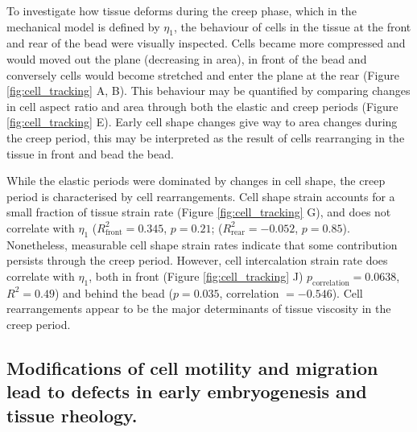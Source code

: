 To investigate how tissue deforms during the creep phase, which in the mechanical model is defined by $\eta_1$, the behaviour of cells in the tissue at the front and rear of the bead were visually inspected.
Cells became more compressed and would moved out the plane (decreasing in area), in front of the bead and conversely cells would become stretched and enter the plane at the rear (Figure \ref{fig:cell_tracking} A, B).
This behaviour may be quantified by comparing changes in cell aspect ratio and area through both the elastic and creep periods (Figure \ref{fig:cell_tracking} E).
Early cell shape changes give way to area changes during the creep period, this may be interpreted as the result of cells rearranging in the tissue in front and bead the bead.

While the elastic periods were dominated by changes in cell shape, the creep period is characterised by cell rearrangements.
Cell shape strain accounts for a small fraction of tissue strain rate (Figure \ref{fig:cell_tracking} G), and does not correlate with $\eta_1$ ($R_\text{front}^2 = 0.345$, $p = 0.21$; ($R_\text{rear}^2 = -0.052$, $p = 0.85$).
Nonetheless, measurable cell shape strain rates indicate that some contribution persists through the creep period.
However, cell intercalation strain rate does correlate with $\eta_1$, both in front (Figure \ref{fig:cell_tracking} J) $p_\text{correlation} = 0.0638$, $R^2 = 0.49$) and behind the bead ($p = 0.035$, correlation $= -0.546$).
Cell rearrangements appear to be the major determinants of tissue viscosity in the creep period.


\subsection{Modifications of cell motility and migration lead to defects in early embryogenesis and tissue rheology.}

